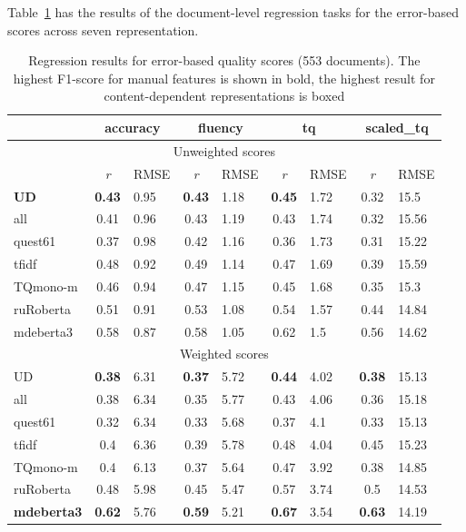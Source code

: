 Table~\ref{tab:doc_err_double} has the results of the document-level regression tasks for the error-based scores across seven representation.

\begin{table}[H]
	\centering
	\begin{tabular}{l|cl|cl|cl|cl}
		\toprule
		& \multicolumn{2}{c|}{accuracy} & \multicolumn{2}{c|}{fluency}  & \multicolumn{2}{c|}{\textbf{tq}} & \multicolumn{2}{c|}{scaled\_tq}    \\
		\midrule
		\multicolumn{9}{c}{Unweighted scores} \\
		\midrule
		       & \textit{r}  & RMSE & \textit{r}  & RMSE & \textit{r}  & RMSE & \textit{r} & RMSE  \\
		\midrule
			\textbf{UD}     & \textbf{0.43} & 0.95 & \textbf{0.43} & 1.18 & \textbf{0.45} & 1.72 & 0.32 & 15.5  \\
			all             & 0.41 & 0.96 & 0.43 & 1.19 & 0.43 & 1.74 & 0.32 & 15.56 \\
			quest61         & 0.37 & 0.98 & 0.42 & 1.16 & 0.36 & 1.73 & 0.31 & 15.22 \\
			\midrule
			tfidf           & 0.48 & 0.92 & 0.49 & 1.14 & 0.47 & 1.69 & 0.39 & 15.59 \\
			\midrule
			TQmono-m        & 0.46 & 0.94 & 0.47 & 1.15 & 0.45 & 1.68 & 0.35 & 15.3  \\
			ruRoberta & 0.51 & 0.91 & 0.53 & 1.08 & 0.54 & 1.57 & 0.44 & 14.84 \\
			mdeberta3  & 0.58 & 0.87 & 0.58 & 1.05 & 0.62 & 1.5  & 0.56 & 14.62 \\
		\midrule
		\midrule
		\multicolumn{9}{c}{Weighted scores} \\
		\midrule
		UD              & \textbf{0.38} & 6.31 & \textbf{0.37} & 5.72 & \textbf{0.44} & 4.02 & \textbf{0.38} & 15.13 \\
		all             & 0.38 & 6.34 & 0.35 & 5.77 & 0.43 & 4.06 & 0.36 & 15.18 \\
		quest61         & 0.32 & 6.34 & 0.33 & 5.68 & 0.37 & 4.1  & 0.33 & 15.13 \\
		\midrule
		tfidf           & 0.4  & 6.36 & 0.39 & 5.78 & 0.48 & 4.04 & 0.45 & 15.23 \\
		\midrule
		TQmono-m        & 0.4  & 6.13 & 0.37 & 5.64 & 0.47 & 3.92 & 0.38 & 14.85 \\
		ruRoberta & 0.48 & 5.98 & 0.45 & 5.47 & 0.57 & 3.74 & 0.5  & 14.53 \\
		\textbf{mdeberta3}  & \textbf{0.62} & 5.76 & \textbf{0.59} & 5.21 & \boxit{0.4in}\textbf{0.67} & 3.54 & \textbf{0.63} & 14.19 \\
		\bottomrule
	\end{tabular}
\caption{\label{tab:doc_err_double}Regression results for error-based quality scores (553 documents). The highest F1-score for manual features is shown in bold, the highest result for content-dependent representations is boxed}
\end{table}

